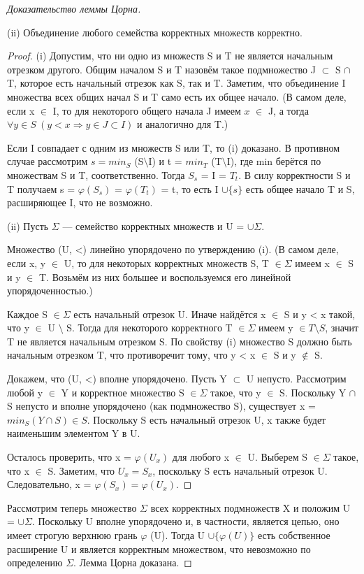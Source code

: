 \begin{proof}[Доказательство леммы Цорна]
\begin{lemma}
		(ii) Объединение любого семейства корректных множеств корректно.
	\end{lemma}

	\begin{proof}
		(i) Допустим, что ни одно из множеств S и T не является начальным отрезком другого. Общим началом S и T назовём
		такое подмножество J $\subset$ S $\cap$ T,  которое есть начальный отрезок как S, так и T. Заметим, что
		объединение I множества всех общих начал S и T само есть их общее начало. (В самом деле, если x $\in$ I, то для
		некоторого общего начала J имеем $x$ $\in$ J, а тогда $\forall y \in S \ (y < x \Rightarrow y \in J \subset I)$
		и аналогично для T.)

		Если I совпадает с одним из множеств S или T, то (i) доказано. В противном случае рассмотрим $s = min_S$
		(S$\setminus$I) и t = $min_T$ (T$\setminus$I), где min берётся по множествам S и T, соответственно. Тогда $S_s$
		= I = $T_t$. В силу корректности S и T получаем s = $\varphi (S_s)$ = $\varphi (T_t)$ = t, то есть I $\cup
		\{s\}$ есть общее начало T и S, расширяющее I, что не возможно.

		(ii) Пусть $\Sigma$ — семейство корректных множеств и U = $\cup \Sigma$.

		Множество (U, <) линейно упорядочено по утверждению (i). (В самом деле, если x, y $\in$ U, то для некоторых
		корректных множеств S, T $\in \Sigma$ имеем x $\in$ S и y $\in$ T. Возьмём из них большее и воспользуемся его
		линейной упорядоченностью.)

		Каждое S $\in \Sigma$ есть начальный отрезок U. Иначе найдётся x $\in$ S и y < x такой, что y $\in$ U $\setminus$ S.
		Тогда для некоторого корректного T $\in \Sigma$ имеем y $\in T \setminus S$,  значит T не является начальным
		отрезком S. По свойству (i) множество S должно быть начальным отрезком T, что противоречит тому, что y < x
		$\in$ S и y $\notin$ S.

		Докажем, что (U, <) вполне упорядочено. Пусть Y $\subset$ U непусто. Рассмотрим любой y $\in$ Y и корректное
		множество S $\in \Sigma$ такое, что y $\in$ S. Поскольку Y $\cap$ S непусто и вполне упорядочено (как
		подмножество S), существует x = $min_S (Y \cap S) \in S$. Поскольку S есть начальный отрезок U, x также будет
		наименьшим элементом Y в U.

		Осталось проверить, что x = $\varphi (U_x)$ для любого x $\in$ U. Выберем S $\in \Sigma$ такое, что x $\in$ S.
		Заметим, что $U_x = S_x$, поскольку S есть начальный отрезок U. Следовательно, x = $\varphi (S_x) = \varphi
		(U_x)$.
	\end{proof}

	Рассмотрим теперь множество $\Sigma$ всех корректных подмножеств X и положим U = $\cup \Sigma$.  Поскольку U вполне
	упорядочено и, в частности, является цепью, оно имеет строгую верхнюю грань $\varphi$ (U). Тогда U $\cup \{\varphi
	(U) \}$ есть собственное расширение U и является корректным множеством, что невозможно по определению $\Sigma$. Лемма
	Цорна доказана.
\end{proof}
